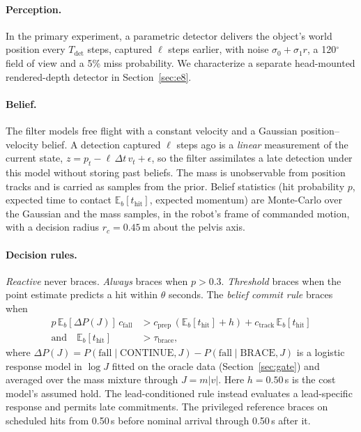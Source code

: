 \documentclass[10pt,twocolumn]{article}
\newcommand{\E}{\mathbb{E}}
\begin{document}
\paragraph{Perception.} In the primary experiment, a parametric detector delivers the object's world position every $T_{\text{det}}$ steps, captured $\ell$ steps earlier, with noise $\sigma_0+\sigma_1 r$, a 120$^\circ$ field of view and a 5\% miss probability. We characterize a separate head-mounted rendered-depth detector in Section~\ref{sec:e8}.

\paragraph{Belief.} The filter models free flight with a constant velocity and a Gaussian position--velocity belief. A detection captured $\ell$ steps ago is a \emph{linear} measurement of the current state, $z = p_t - \ell\,\Delta t\, v_t + \epsilon$, so the filter assimilates a late detection under this model without storing past beliefs. The mass is unobservable from position tracks and is carried as samples from the prior. Belief statistics (hit probability $p$, expected time to contact $\E_b[t_{\text{hit}}]$, expected momentum) are Monte-Carlo over the Gaussian and the mass samples, in the robot's frame of commanded motion, with a decision radius $r_c=0.45$\,m about the pelvis axis.

\paragraph{Decision rules.} \emph{Reactive} never braces. \emph{Always} braces when $p>0.3$. \emph{Threshold} braces when the point estimate predicts a hit within $\theta$ seconds. The \emph{belief commit rule} braces when
\begin{equation}
\begin{aligned}
p\,\E_b[\Delta P(J)]\,c_{\text{fall}} &> c_{\text{prep}}\,(\E_b[t_{\text{hit}}]+h) + c_{\text{track}}\,\E_b[t_{\text{hit}}]\\
\text{and}\quad \E_b[t_{\text{hit}}] &> \tau_{\text{brace}},
\end{aligned}
\label{eq:rule}
\end{equation}
where $\Delta P(J)=P(\text{fall}\mid\text{CONTINUE},J)-P(\text{fall}\mid\text{BRACE},J)$ is a logistic response model in $\log J$ fitted on the oracle data (Section~\ref{sec:gate}) and averaged over the mass mixture through $J=m|v|$. Here $h=0.50$\,s is the cost model's assumed hold. The lead-conditioned rule instead evaluates a lead-specific response and permits late commitments. The privileged reference braces on scheduled hits from 0.50\,s before nominal arrival through 0.50\,s after it.
\end{document}

